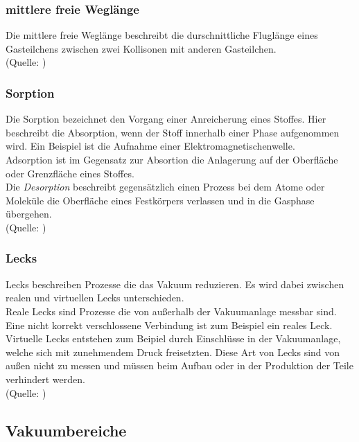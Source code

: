 		\subsubsection{mittlere freie Weglänge}
			\noindent
			Die mittlere freie Weglänge beschreibt die durschnittliche Fluglänge eines Gasteilchens zwischen zwei Kollisonen mit anderen Gasteilchen.\\
			(Quelle: \cite{wiki:mfg})

		\subsubsection{Sorption}
			
			\noindent
			Die Sorption bezeichnet den Vorgang einer Anreicherung eines Stoffes. 
			Hier beschreibt die Absorption, wenn der Stoff innerhalb einer Phase aufgenommen wird. Ein Beispiel ist die Aufnahme einer Elektromagnetischenwelle.\\
			Adsorption ist im Gegensatz zur Absortion die Anlagerung auf der Oberfläche oder Grenzfläche eines Stoffes.\\
			Die \textit{Desorption} beschreibt gegensätzlich einen Prozess bei dem Atome oder Moleküle die Oberfläche eines Festkörpers verlassen und in die Gasphase übergehen.\\
			(Quelle: \cite{wiki:sorp})
			
		\subsubsection{Lecks}

			Lecks beschreiben Prozesse die das Vakuum reduzieren. Es wird dabei zwischen realen und virtuellen Lecks unterschieden.\\
			Reale Lecks sind Prozesse die von außerhalb der Vakuumanlage messbar sind. Eine nicht korrekt verschlossene Verbindung ist zum Beispiel ein reales Leck.\\
			Virtuelle Lecks entstehen zum Beipiel durch Einschlüsse in der Vakuumanlage, welche sich mit zunehmendem Druck freisetzten.
			Diese Art von Lecks sind von außen nicht zu messen und müssen beim Aufbau oder in der Produktion der Teile verhindert werden.\\
			(Quelle: \cite{pfeiffer:grund})

	\subsection{Vakuumbereiche}

